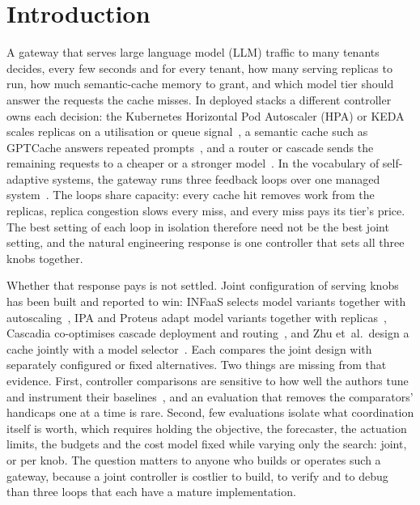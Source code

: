 \section{Introduction}
\label{sec:intro}

A gateway that serves large language model (LLM) traffic to many tenants
decides, every few seconds and for every tenant, how many serving replicas
to run, how much semantic-cache memory to grant, and which model tier
should answer the requests the cache misses. In deployed stacks a
different controller owns each decision: the Kubernetes Horizontal Pod
Autoscaler (HPA) or KEDA scales replicas on a utilisation or queue
signal~\cite{k8shpa,keda}, a semantic cache such as GPTCache answers
repeated prompts~\cite{gptcache}, and a router or cascade sends the
remaining requests to a cheaper or a stronger model~\cite{frugalgpt,routellm}.
In the vocabulary of self-adaptive systems, the gateway runs three
feedback loops over one managed system~\cite{kephart2003,weyns2013}. The
loops share capacity: every cache hit removes work from the replicas,
replica congestion slows every miss, and every miss pays its tier's price.
The best setting of each loop in isolation therefore need not be the best
joint setting, and the natural engineering response is one controller
that sets all three knobs together.

Whether that response pays is not settled. Joint configuration of serving
knobs has been built and reported to win: INFaaS selects model variants
together with autoscaling~\cite{infaas}, IPA and Proteus adapt model
variants together with replicas~\cite{ipa,proteus}, Cascadia co-optimises
cascade deployment and routing~\cite{cascadia}, and Zhu et~al.\ design a
cache jointly with a model selector~\cite{zhu2023}. Each compares the joint
design with separately configured or fixed alternatives. Two things are
missing from that evidence. First, controller comparisons are sensitive to
how well the authors tune and instrument their
baselines~\cite{chameleon,zhang2026drl,khilji2026}, and an evaluation that
removes the comparators' handicaps one at a time is rare. Second, few
evaluations isolate what coordination itself is worth, which requires
holding the objective, the forecaster, the actuation limits, the budgets
and the cost model fixed while varying only the search: joint, or per
knob. The question matters to anyone who builds or operates such a
gateway, because a joint controller is costlier to build, to verify and to
debug than three loops that each have a mature implementation.

